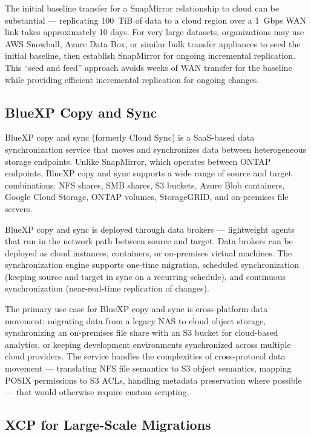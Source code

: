 The initial baseline transfer for a SnapMirror relationship to cloud can be
substantial --- replicating 100~TiB of data to a cloud region over a 1~Gbps
WAN link takes approximately 10 days. For very large datasets, organizations
may use AWS Snowball, Azure Data Box, or similar bulk transfer appliances to
seed the initial baseline, then establish SnapMirror for ongoing incremental
replication. This ``seed and feed'' approach avoids weeks of WAN transfer for
the baseline while providing efficient incremental replication for ongoing
changes.

\subsection{BlueXP Copy and Sync}

BlueXP copy and sync (formerly Cloud Sync) is a SaaS-based data
synchronization service that moves and synchronizes data between heterogeneous
storage endpoints. Unlike SnapMirror, which operates between ONTAP endpoints,
BlueXP copy and sync supports a wide range of source and target combinations:
NFS shares, SMB shares, S3 buckets, Azure Blob containers, Google Cloud
Storage, ONTAP volumes, StorageGRID, and on-premises file servers.

BlueXP copy and sync is deployed through data brokers --- lightweight agents
that run in the network path between source and target. Data brokers can be
deployed as cloud instances, containers, or on-premises virtual machines. The
synchronization engine supports one-time migration, scheduled synchronization
(keeping source and target in sync on a recurring schedule), and continuous
synchronization (near-real-time replication of changes).

The primary use case for BlueXP copy and sync is cross-platform data movement:
migrating data from a legacy NAS to cloud object storage, synchronizing an
on-premises file share with an S3 bucket for cloud-based analytics, or keeping
development environments synchronized across multiple cloud providers. The
service handles the complexities of cross-protocol data movement ---
translating NFS file semantics to S3 object semantics, mapping POSIX
permissions to S3 ACLs, handling metadata preservation where possible --- that
would otherwise require custom scripting.

\subsection{XCP for Large-Scale Migrations}

